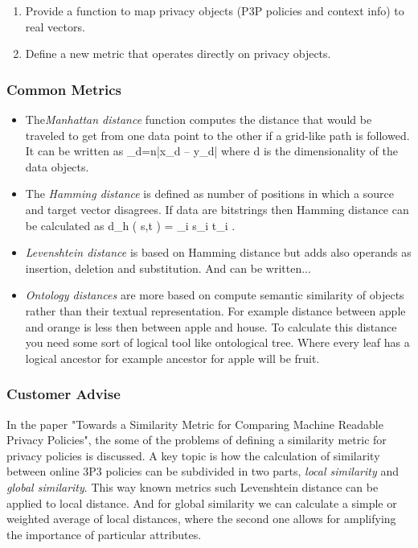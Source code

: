 \begin{enumerate}
\item Provide a function to map privacy objects (P3P policies and context info) to real vectors.
\item Define a new metric that operates directly on privacy objects.
\end{enumerate}
 

\subsubsection{Common Metrics}

\begin{itemize}
\item The\emph{Manhattan distance} function computes the distance that would be traveled to get from one data point to the other if a grid-like path is followed. It can be written as \sum_{d=n}|x_d – y_d| where d is the dimensionality of the data objects. 
\item The \emph{Hamming distance} is defined as number of positions in which a source and target vector disagrees. If data are bitstrings then Hamming distance can be calculated as d_h \left( s,t \right) = \sum_{i} s_i \bigoplus t_i .
 
\item \emph{Levenshtein distance} is based on Hamming distance but adds also operands as insertion, deletion and substitution. And can be written... 
 
\item \emph{Ontology distances} are more based on compute semantic similarity of objects rather than their textual representation. For example distance between apple and orange is less then between apple and house. To calculate this distance you need some sort of logical tool like ontological tree. Where every leaf has a logical ancestor for example ancestor for apple will be fruit.
\end{itemize}
 
\subsubsection{Customer Advise}

In the paper "Towards a Similarity Metric for Comparing Machine Readable Privacy Policies", the some of the problems of defining a similarity metric for privacy policies is discussed. A key topic is how the calculation of similarity between online 3P3 policies can be subdivided in two parts, \emph{local similarity} and \emph{global similarity}. This way known metrics such Levenshtein distance  can be applied to local distance. And for global similarity we can calculate a simple or weighted average of local distances, where the second one allows for amplifying the importance of particular attributes.

